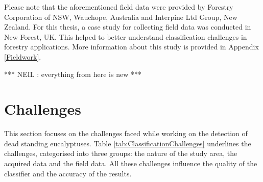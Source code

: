 \documentclass{subfiles}
\begin{document}
\par Please note that the aforementioned field data were provided by Forestry Corporation of NSW, Wauchope, Australia and Interpine Ltd Group, New Zealand. For this thesis, a case study for collecting field data was conducted in New Forest, UK. This helped to better understand classification challenges in forestry applications. More information about this study is provided in Appendix \ref{Fieldwork}.

{\color{red} *** NEIL : everything from here is new ***}

\section{Challenges}
\par This section focuses on the challenges faced while working on the detection of dead standing eucalyptuses. Table \ref{tab:ClassificationChallenges} underlines the challenges, categorised into three groups: the nature of the study area, the acquired data and the field data. All these challenges influence the quality of the classifier and the accuracy of the results. 
\end{document}
